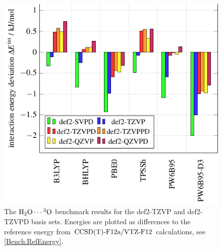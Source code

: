 \begin{figure}[b!]
\centering
% 
\includegraphics[width=.7\textwidth]{TikzPics/TikzCreation/Bench/BenchH2O+O.FuncCompare.pdf}
\caption{The $\mbox{\ensuremath{\text H _2 \text O \cdots \hspace{.2pt} ^3\text{O}}}$ benchmark results for the def2-TZVP and def2-TZVPD basis sets.
Energies are plotted as differences
to the reference energy from $\text{CCSD(T)-F12a}/\text{VTZ-F}12$ calculations, see \eqref{Bench:RefEnergy}.}
\label{Fig:Bench:H2O+O:FuncCompare}
\end{figure}
